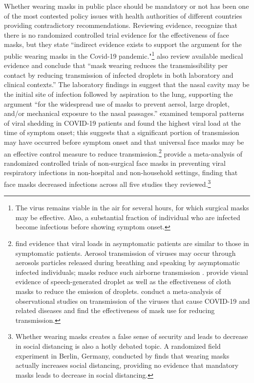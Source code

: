 \documentclass[3p, longtitle]{elsarticle}
\theoremstyle{definition}
\begin{document}
Whether wearing  masks in public place should be mandatory or not has been one of the most contested policy issues with health authorities of different countries providing contradictory recommendations. Reviewing evidence, \cite{Greenhalghm2020}  recognize that there is no randomized controlled trial evidence for the effectiveness of face masks,  but they state ``indirect evidence exists to support the argument for the public wearing masks in the Covid-19 pandemic."\footnote{The virus remains viable in the air for several hours, for which surgical masks may be effective. Also, a substantial fraction of individual who are infected become infectious before showing symptom onset.}
\cite{howard2020} also review available medical evidence and conclude that ``mask wearing reduces the transmissibility per contact by reducing transmission of infected droplets in both laboratory and clinical contexts.''  The laboratory findings in \cite{hou2020} suggest that the nasal cavity may be the initial site of infection followed by aspiration to the lung, supporting the argument  ``for the widespread use of masks to prevent aersol, large droplet, and/or mechanical exposure to the nasal passages.''   \cite{He2020} examined temporal patterns of viral shedding in COVID-19 patients and found the highest viral load at the time of symptom onset; this suggests that a significant portion of transmission may have occurred before symptom onset and that universal face masks may be an effective control measure to reduce transmission.\footnote{\cite{Lee2020} find evidence that viral loads in asymptomatic patients are similar to those in symptomatic patients. Aerosol transmission of viruses may occur through aerosols particles released during breathing and speaking by asymptomatic infected individuals; masks reduce such airborne transmission \citep{Prather2020}. \cite{Anfinrud2020} provide visual evidence of speech-generated droplet as well as the effectiveness of cloth masks to reduce the emission of droplets.   \cite{Chu2020} conduct a meta-analysis of observational studies on transmission of the viruses that cause COVID-19 and related diseases and find the effectiveness of mask use for reducing transmission. } \cite{ollila2020} provide a meta-analysis of randomized controlled trials of non-surgical face masks in preventing viral respiratory infections in non-hospital and non-household settings, finding that face masks decreased infections across all five studies they reviewed.\footnote{Whether wearing masks creates a false sense of security and leads to decrease in social distancing is also a hotly debated topic.  A randomized field experiment in Berlin, Germany, conducted by \cite{seres2020}  finds that wearing masks actually increases social distancing, providing no evidence that mandatory masks leads to decrease in social distancing.}
\end{document}
